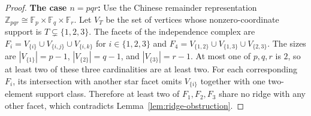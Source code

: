 \documentclass[12pt, reqno]{amsart}
\theoremstyle{definition}
\numberwithin{equation}{section}
\begin{document}
\begin{proof}
		\textbf{The case $n=pqr$:} 
		Use the Chinese remainder representation $\mathbb Z_{pqr}\cong\mathbb F_p\times\mathbb F_q\times\mathbb F_r$. Let $V_T$ be the set of vertices whose nonzero-coordinate support is $T \subsetneq \{1,2,3\}$. The facets of the independence complex are $F_i=V_{\{i\}}\cup V_{\{i,j\}}\cup V_{\{i,k\}}$ for $i \in \{1,2,3\}$ and $F_4=V_{\{1,2\}}\cup V_{\{1,3\}}\cup V_{\{2,3\}}$. The sizes are $|V_{\{1\}}|=p-1$, $|V_{\{2\}}|=q-1$, and $|V_{\{3\}}|=r-1$. At most one of $p,q,r$ is $2$, so at least two of these three cardinalities are at least two. For each corresponding $F_i$, its intersection with another star facet omits $V_{\{i\}}$ together with one two-element support class. Therefore at least two of $F_1,F_2,F_3$ share no ridge with any other facet, which contradicts Lemma~\ref{lem:ridge-obstruction}.
	\end{proof}
	
\end{document}
